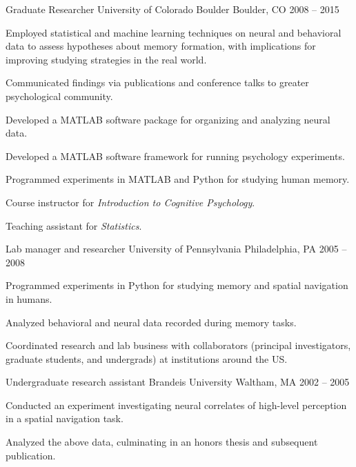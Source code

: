 \begin{cventries}
  \cventry
    {Graduate Researcher} %
    {University of Colorado Boulder} %
    {Boulder, CO} %
    {2008 -- 2015} %
    {
      \begin{cvitems} %
        \item {Employed statistical and machine learning techniques on neural and behavioral data to assess hypotheses about memory formation, with implications for improving studying strategies in the real world.}
        \item {Communicated findings via publications and conference talks to greater psychological community.}
        \item {Developed a MATLAB software package for organizing and analyzing neural data.}
        \item {Developed a MATLAB software framework for running psychology experiments.}
        \item {Programmed experiments in MATLAB and Python for studying human memory.}
        \item {Course instructor for \textit{Introduction to Cognitive Psychology}.}
        \item {Teaching assistant for \textit{Statistics}.}
      \end{cvitems}
    }

  \cventry
    {Lab manager and researcher} %
    {University of Pennsylvania} %
    {Philadelphia, PA} %
    {2005 -- 2008} %
    {
      \begin{cvitems} %
        \item {Programmed experiments in Python for studying memory and spatial navigation in humans.}
        \item {Analyzed behavioral and neural data recorded during memory tasks.}
        \item {Coordinated research and lab business with collaborators (principal investigators, graduate students, and undergrads) at institutions around the US.}
      \end{cvitems}
    }

  \cventry
    {Undergraduate research assistant} %
    {Brandeis University} %
    {Waltham, MA} %
    {2002 -- 2005} %
    {
      \begin{cvitems} %
        \item {Conducted an experiment investigating neural correlates of high-level perception in a spatial navigation task.}
        \item {Analyzed the above data, culminating in an honors thesis and subsequent publication.}
      \end{cvitems}
    }

\end{cventries}
